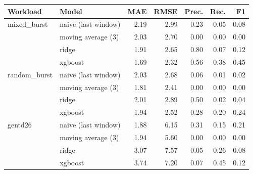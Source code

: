 \begin{tabular}{llrrrrr}
\toprule
Workload & Model & MAE & RMSE & Prec. & Rec. & F1 \\
\midrule
mixed\_burst & naive (last window) & 2.19 & 2.99 & 0.23 & 0.05 & 0.08 \\
 & moving average (3) & 2.03 & 2.70 & 0.00 & 0.00 & 0.00 \\
 & ridge & 1.91 & 2.65 & 0.80 & 0.07 & 0.12 \\
 & xgboost & 1.69 & 2.32 & 0.56 & 0.38 & 0.45 \\
random\_burst & naive (last window) & 2.03 & 2.68 & 0.06 & 0.01 & 0.02 \\
 & moving average (3) & 1.81 & 2.41 & 0.00 & 0.00 & 0.00 \\
 & ridge & 2.01 & 2.89 & 0.50 & 0.02 & 0.04 \\
 & xgboost & 1.94 & 2.52 & 0.28 & 0.20 & 0.24 \\
gentd26 & naive (last window) & 1.88 & 6.15 & 0.31 & 0.15 & 0.21 \\
 & moving average (3) & 1.94 & 5.60 & 0.00 & 0.00 & 0.00 \\
 & ridge & 3.07 & 7.57 & 0.05 & 0.26 & 0.08 \\
 & xgboost & 3.74 & 7.20 & 0.07 & 0.45 & 0.12 \\
\bottomrule
\end{tabular}
